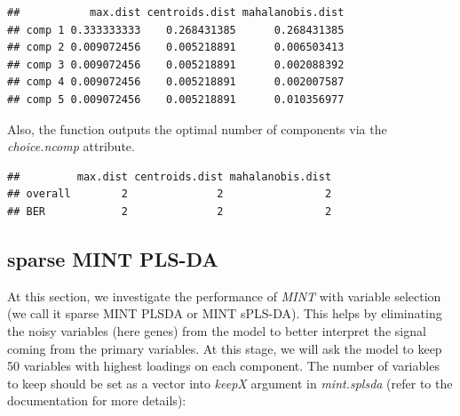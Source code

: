 \documentclass[]{book}
\newenvironment{Shaded}{\begin{snugshade}}{\end{snugshade}}
\newcommand{\CommentTok}[1]{\textcolor[rgb]{0.56,0.35,0.01}{\textit{#1}}}
\newcommand{\NormalTok}[1]{#1}
\newcommand{\OperatorTok}[1]{\textcolor[rgb]{0.81,0.36,0.00}{\textbf{#1}}}
\theoremstyle{definition}
\theoremstyle{definition}
\theoremstyle{definition}
\theoremstyle{remark}
\begin{document}
\begin{Shaded}
\end{Shaded}

\begin{verbatim}
##           max.dist centroids.dist mahalanobis.dist
## comp 1 0.333333333    0.268431385      0.268431385
## comp 2 0.009072456    0.005218891      0.006503413
## comp 3 0.009072456    0.005218891      0.002088392
## comp 4 0.009072456    0.005218891      0.002007587
## comp 5 0.009072456    0.005218891      0.010356977
\end{verbatim}

Also, the function outputs the optimal number of components via the
\emph{choice.ncomp} attribute.

\begin{Shaded}
\end{Shaded}

\begin{verbatim}
##         max.dist centroids.dist mahalanobis.dist
## overall        2              2                2
## BER            2              2                2
\end{verbatim}

\hypertarget{sparse-mint-pls-da}{%
\subsection{sparse MINT PLS-DA}\label{sparse-mint-pls-da}}

At this section, we investigate the performance of \emph{MINT} with
variable selection (we call it sparse MINT PLSDA or MINT sPLS-DA). This
helps by eliminating the noisy variables (here genes) from the model to
better interpret the signal coming from the primary variables. At this
stage, we will ask the model to keep 50 variables with highest loadings
on each component. The number of variables to keep should be set as a
vector into \emph{keepX} argument in \emph{mint.splsda} (refer to the
documentation for more details):
\end{document}
